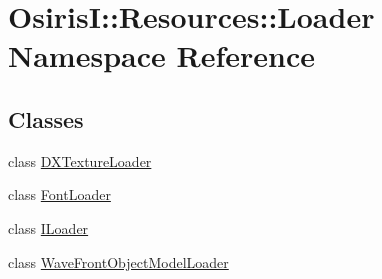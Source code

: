 \hypertarget{namespace_osiris_i_1_1_resources_1_1_loader}{\section{Osiris\-I\-:\-:Resources\-:\-:Loader Namespace Reference}
\label{namespace_osiris_i_1_1_resources_1_1_loader}
}
\subsection*{Classes}
\begin{DoxyCompactItemize}
\item 
class \hyperlink{class_osiris_i_1_1_resources_1_1_loader_1_1_d_x_texture_loader}{D\-X\-Texture\-Loader}
\item 
class \hyperlink{class_osiris_i_1_1_resources_1_1_loader_1_1_font_loader}{Font\-Loader}
\item 
class \hyperlink{class_osiris_i_1_1_resources_1_1_loader_1_1_i_loader}{I\-Loader}
\item 
class \hyperlink{class_osiris_i_1_1_resources_1_1_loader_1_1_wave_front_object_model_loader}{Wave\-Front\-Object\-Model\-Loader}
\end{DoxyCompactItemize}
